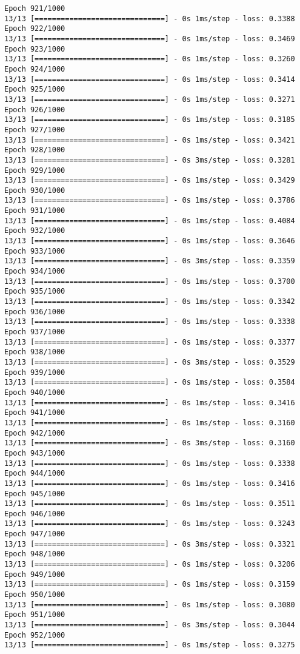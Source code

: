 \documentclass[11pt]{article}
\begin{document}
\begin{Verbatim}[commandchars=\\\{\}]
Epoch 921/1000
13/13 [==============================] - 0s 1ms/step - loss: 0.3388
Epoch 922/1000
13/13 [==============================] - 0s 1ms/step - loss: 0.3469
Epoch 923/1000
13/13 [==============================] - 0s 1ms/step - loss: 0.3260
Epoch 924/1000
13/13 [==============================] - 0s 1ms/step - loss: 0.3414
Epoch 925/1000
13/13 [==============================] - 0s 1ms/step - loss: 0.3271
Epoch 926/1000
13/13 [==============================] - 0s 1ms/step - loss: 0.3185
Epoch 927/1000
13/13 [==============================] - 0s 1ms/step - loss: 0.3421
Epoch 928/1000
13/13 [==============================] - 0s 3ms/step - loss: 0.3281
Epoch 929/1000
13/13 [==============================] - 0s 1ms/step - loss: 0.3429
Epoch 930/1000
13/13 [==============================] - 0s 1ms/step - loss: 0.3786
Epoch 931/1000
13/13 [==============================] - 0s 1ms/step - loss: 0.4084
Epoch 932/1000
13/13 [==============================] - 0s 1ms/step - loss: 0.3646
Epoch 933/1000
13/13 [==============================] - 0s 3ms/step - loss: 0.3359
Epoch 934/1000
13/13 [==============================] - 0s 1ms/step - loss: 0.3700
Epoch 935/1000
13/13 [==============================] - 0s 1ms/step - loss: 0.3342
Epoch 936/1000
13/13 [==============================] - 0s 1ms/step - loss: 0.3338
Epoch 937/1000
13/13 [==============================] - 0s 1ms/step - loss: 0.3377
Epoch 938/1000
13/13 [==============================] - 0s 3ms/step - loss: 0.3529
Epoch 939/1000
13/13 [==============================] - 0s 1ms/step - loss: 0.3584
Epoch 940/1000
13/13 [==============================] - 0s 1ms/step - loss: 0.3416
Epoch 941/1000
13/13 [==============================] - 0s 1ms/step - loss: 0.3160
Epoch 942/1000
13/13 [==============================] - 0s 3ms/step - loss: 0.3160
Epoch 943/1000
13/13 [==============================] - 0s 1ms/step - loss: 0.3338
Epoch 944/1000
13/13 [==============================] - 0s 1ms/step - loss: 0.3416
Epoch 945/1000
13/13 [==============================] - 0s 1ms/step - loss: 0.3511
Epoch 946/1000
13/13 [==============================] - 0s 1ms/step - loss: 0.3243
Epoch 947/1000
13/13 [==============================] - 0s 3ms/step - loss: 0.3321
Epoch 948/1000
13/13 [==============================] - 0s 1ms/step - loss: 0.3206
Epoch 949/1000
13/13 [==============================] - 0s 1ms/step - loss: 0.3159
Epoch 950/1000
13/13 [==============================] - 0s 1ms/step - loss: 0.3080
Epoch 951/1000
13/13 [==============================] - 0s 3ms/step - loss: 0.3044
Epoch 952/1000
13/13 [==============================] - 0s 1ms/step - loss: 0.3275

\end{Verbatim}
\end{document}
